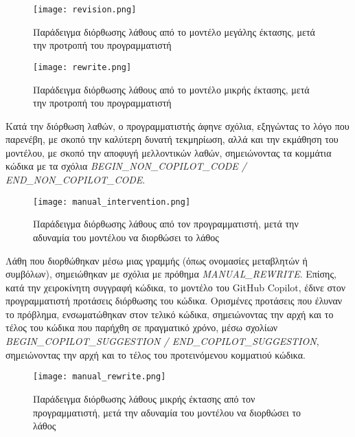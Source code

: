 \begin{figure}[H]
  \begin{center}
    \texttt{[image: revision.png]}
    \caption{Παράδειγμα διόρθωσης λάθους από το μοντέλο μεγάλης έκτασης,
    μετά την προτροπή του προγραμματιστή}
  \end{center}
  \label{fig:revision}
\end{figure}

\begin{figure}[H]
  \begin{center}
    \texttt{[image: rewrite.png]}
    \caption{Παράδειγμα διόρθωσης λάθους από το μοντέλο μικρής έκτασης,
    μετά την προτροπή του προγραμματιστή}
  \end{center}
  \label{fig:rewrite}
\end{figure}

Κατά την διόρθωση λαθών, ο προγραμματιστής άφηνε σχόλια, εξηγώντας το
λόγο που παρενέβη, με σκοπό την καλύτερη δυνατή τεκμηρίωση, αλλά και την
εκμάθηση του μοντέλου, με σκοπό την αποφυγή μελλοντικών λαθών,
σημειώνοντας τα κομμάτια κώδικα με τα σχόλια
\textlatin{\textit{BEGIN\_NON\_COPILOT\_CODE /
END\_NON\_COPILOT\_CODE}}.

\begin{figure}[H]
  \begin{center}
    \texttt{[image: manual\_intervention.png]}
    \caption{Παράδειγμα διόρθωσης λάθους από τον προγραμματιστή, μετά
    την αδυναμία του μοντέλου να διορθώσει το λάθος}
  \end{center}
  \label{fig:nonCopilotCode}
\end{figure}

Λάθη που διορθώθηκαν μέσω μιας γραμμής (όπως ονομασίες μεταβλητών ή
συμβόλων), σημειώθηκαν με σχόλια με πρόθημα
\textlatin{\textit{MANUAL\_REWRITE}}. Επίσης, κατά την χειροκίνητη
συγγραφή κώδικα, το μοντέλο του \textlatin{GitHub Copilot}, έδινε στον
προγραμματιστή προτάσεις διόρθωσης του κώδικα. Ορισμένες προτάσεις που
έλυναν το πρόβλημα, ενσωματώθηκαν στον τελικό κώδικα, σημειώνοντας την
αρχή και το τέλος του κώδικα που παρήχθη σε πραγματικό χρόνο, μέσω
σχολίων \textlatin{\textit{BEGIN\_COPILOT\_SUGGESTION /
END\_COPILOT\_SUGGESTION}}, σημειώνοντας την αρχή και το τέλος του
προτεινόμενου κομματιού κώδικα.

\begin{figure}[H]
  \begin{center}
    \texttt{[image: manual\_rewrite.png]}
    \caption{Παράδειγμα διόρθωσης λάθους μικρής έκτασης από τον
      προγραμματιστή, μετά την αδυναμία του μοντέλου να διορθώσει το
    λάθος}
  \end{center}
  \label{fig:manualRewrite}
\end{figure}

